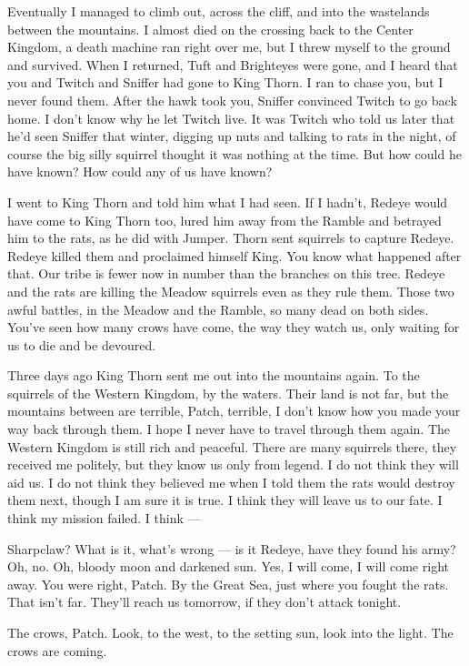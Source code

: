 \documentclass[12pt]{memoir}
\begin{document}
Eventually I managed to climb out, across the cliff, and into the
wastelands between the mountains. I almost died on the crossing back
to the Center Kingdom, a death machine ran right over me, but I threw
myself to the ground and survived. When I returned, Tuft and
Brighteyes were gone, and I heard that you and Twitch and Sniffer had
gone to King Thorn. I ran to chase you, but I never found them. After
the hawk took you, Sniffer convinced Twitch to go back home. I don’t
know why he let Twitch live. It was Twitch who told us later that he’d
seen Sniffer that winter, digging up nuts and talking to rats in the
night, of course the big silly squirrel thought it was nothing at the
time. But how could he have known? How could any of us have known?

I went to King Thorn and told him what I had seen. If I hadn’t, Redeye
would have come to King Thorn too, lured him away from the Ramble and
betrayed him to the rats, as he did with Jumper. Thorn sent squirrels
to capture Redeye. Redeye killed them and proclaimed himself King. You
know what happened after that. Our tribe is fewer now in number than
the branches on this tree. Redeye and the rats are killing the Meadow
squirrels even as they rule them. Those two awful battles, in the
Meadow and the Ramble, so many dead on both sides. You’ve seen how
many crows have come, the way they watch us, only waiting for us to
die and be devoured.

Three days ago King Thorn sent me out into the mountains again. To the
squirrels of the Western Kingdom, by the waters. Their land is not
far, but the mountains between are terrible, Patch, terrible, I don’t
know how you made your way back through them. I hope I never have to
travel through them again. The Western Kingdom is still rich and
peaceful. There are many squirrels there, they received me politely,
but they know us only from legend. I do not think they will aid us. I
do not think they believed me when I told them the rats would destroy
them next, though I am sure it is true. I think they will leave us to
our fate. I think my mission failed. I think —

Sharpclaw? What is it, what’s wrong — is it Redeye, have they found
his army? Oh, no. Oh, bloody moon and darkened sun. Yes, I will come,
I will come right away. You were right, Patch. By the Great Sea, just
where you fought the rats. That isn’t far. They’ll reach us tomorrow,
if they don’t attack tonight.

The crows, Patch. Look, to the west, to the setting sun, look into the
light. The crows are coming.
\end{document}
